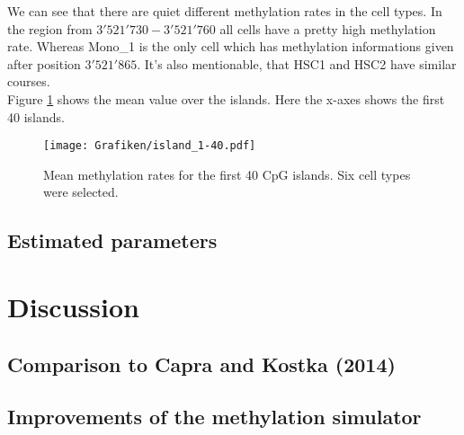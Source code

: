 \documentclass[12pt]{article} %
\begin{document}
	We can see that there are quiet different methylation rates in the cell types. In the region from $3'521'730 - 3'521'760$ all cells have a pretty high methylation rate. Whereas Mono\_{}1 is the only cell which has methylation informations given after position $3'521'865$. It's also mentionable, that HSC1 and HSC2 have similar courses.\\
	Figure \ref{img:island_1-40} shows the mean value over the islands. Here the x-axes shows the first 40 islands.	
	
	\begin{figure}[h]
		\texttt{[image: Grafiken/island\_1-40.pdf]}
		\caption{Mean methylation rates for the first 40 CpG islands. Six cell types were selected.}
		\label{img:island_1-40}
	\end{figure}

	\subsection{Estimated parameters}

	\section{Discussion}
	\subsection{Comparison to Capra and Kostka (2014)}
	\subsection{Improvements of the methylation simulator}
	
	
\end{document}
